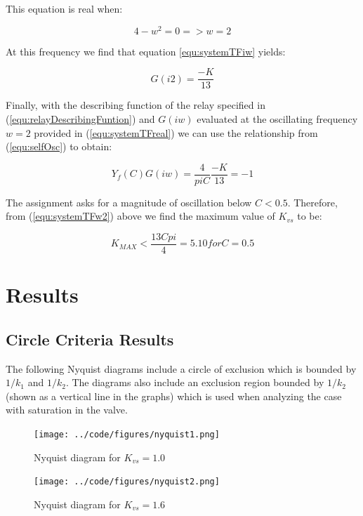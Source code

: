 \documentclass[a4paper, titlepage]{article}
\begin{document}
This equation is real when:

\begin{equation}
4-w^2 = 0 => w=2
\label{equ:systemTFreal}
\end{equation}

At this frequency we find that equation \ref{equ:systemTFiw} yields:

\begin{equation}
G(i2) = \frac{-K}{13}
\label{equ:systemTFw2}
\end{equation}

Finally, with the describing function of the relay specified in  (\ref{equ:relayDescribingFuntion}) and $G(iw)$ evaluated at the oscillating frequency $w=2$ provided in (\ref{equ:systemTFreal}) we can use the relationship from (\ref{equ:selfOsc}) to obtain:

\begin{equation}
Y_{f}(C)G(iw) = \frac{4}{piC}\frac{-K}{13} = -1
\label{equ:systemTFw2}
\end{equation}

The assignment asks for a magnitude of oscillation below $C < 0.5$.
Therefore, from (\ref{equ:systemTFw2}) above we find the maximum value of $K_{vs}$ to be:

\begin{equation}
K_{MAX} < \frac{13Cpi}{4} = 5.10 for C=0.5
\label{equ:maximum_k}
\end{equation}

\section{Results}

\subsection{Circle Criteria Results}
The following Nyquist diagrams include a circle of exclusion which is bounded by $1/k_{1}$ and $1/k_{2}$.  The diagrams also include an exclusion region bounded by $1/k_{2}$ (shown as a vertical line in the graphs) which is used when analyzing the case with saturation in the valve.

\begin{figure}[h!]
\center
\texttt{[image: ../code/figures/nyquist1.png]}
\caption{Nyquist diagram for $K_{vs}=1.0$}
\label{fig:nyquist1}
\end{figure}

\begin{figure}[h!]
\center
\texttt{[image: ../code/figures/nyquist2.png]}
\caption{Nyquist diagram for $K_{vs}=1.6$}
\label{fig:nyquist2}
\end{figure}
\end{document}
